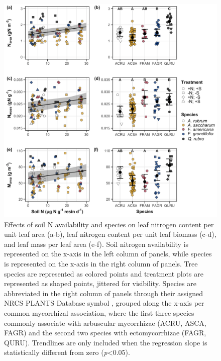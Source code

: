 \newpage
\begin{figure}
    \includegraphics[width=\columnwidth]{ch3_NxpH/figs/NxS_fig1_leafn.jpg}
    \centering
    \caption[Effects of soil nitrogen availability and species on leaf nitrogen content per unit leaf area, leaf nitrogen content per unit leaf biomass, and leaf mass per leaf area]{Effects of soil N availability and species on leaf nitrogen content per unit leaf area (a-b), leaf nitrogen content per unit leaf biomass (c-d), and leaf mass per leaf area (e-f). Soil nitrogen availability is represented on the x-axis in the left column of panels, while species is represented on the x-axis in the right column of panels. Tree species are represented as colored points and treatment plots are represented as shaped points, jittered for visibility. Species are abbreviated in the right column of panels through their assigned NRCS PLANTS Database symbol , grouped along the x-axis per common mycorrhizal association, where the first three species commonly associate with arbuscular mycorrhizae (ACRU, ASCA, FAGR) and the second two species with ectomycorrhizae (FAGR, QURU). Trendlines are only included when the regression slope is statistically different from zero (\textit{p}<0.05).}
    \label{fig:figure3.1}
\end{figure}
\clearpage

